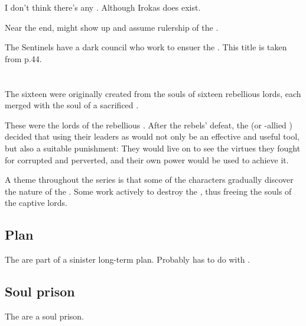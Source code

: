 I don't think there's any \dragonking. Although \Bloodline{} Irokas does exist. 

Near the end, \ApepNesthra{} might show up and assume rulership of the \dragons. 

The Sentinels have a dark council who work to ensuer the . This title is taken from \DIBiggestSecret{} p.44.















\section{\Sephiroth}
\label{Sephiroth}
The sixteen \Sephiroth{} were originally created from the souls of sixteen rebellious \resphan{} lords, each merged with the soul of a sacrificed \banelord. 

These \resphain{} were the lords of the rebellious \Kezeradi. After the rebels' defeat, the \banes{} (or \bane-allied \resphain) decided that using their leaders as \Sephiroth{} would not only be an effective and useful tool, but also a suitable punishment: They would live on to see the virtues they fought for corrupted and perverted, and their own power would be used to achieve it. 

A theme throughout the series is that some of the characters gradually discover the nature of the \sephiroth. Some work actively to destroy the \sephiroth, thus freeing the souls of the captive \Kezeradi{} lords. 









\subsection{Plan}
\label{\Sephirah{} plan}
The \sephiroth{} are part of a sinister long-term plan. Probably has to do with . 









\subsection{Soul prison}
The \sephiroth{} are a soul prison. 

